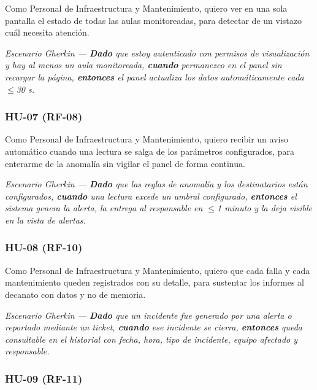 
Como Personal de Infraestructura y Mantenimiento, quiero ver en una sola pantalla el estado de todas las aulas monitoreadas, para detectar de un vistazo cuál necesita atención.

\textit{Escenario Gherkin --- \textbf{Dado} que estoy autenticado con permisos de visualización y hay al menos un aula monitoreada, \textbf{cuando} permanezco en el panel sin recargar la página, \textbf{entonces} el panel actualiza los datos automáticamente cada $\leq$30 s.}

\subsubsection*{HU-07 (RF-08)}


Como Personal de Infraestructura y Mantenimiento, quiero recibir un aviso automático cuando una lectura se salga de los parámetros configurados, para enterarme de la anomalía sin vigilar el panel de forma continua.

\textit{Escenario Gherkin --- \textbf{Dado} que las reglas de anomalía y los destinatarios están configurados, \textbf{cuando} una lectura excede un umbral configurado, \textbf{entonces} el sistema genera la alerta, la entrega al responsable en $\leq$1 minuto y la deja visible en la vista de alertas.}

\subsubsection*{HU-08 (RF-10)}


Como Personal de Infraestructura y Mantenimiento, quiero que cada falla y cada mantenimiento queden registrados con su detalle, para sustentar los informes al decanato con datos y no de memoria.

\textit{Escenario Gherkin --- \textbf{Dado} que un incidente fue generado por una alerta o reportado mediante un ticket, \textbf{cuando} ese incidente se cierra, \textbf{entonces} queda consultable en el historial con fecha, hora, tipo de incidente, equipo afectado y responsable.}

\subsubsection*{HU-09 (RF-11)}

